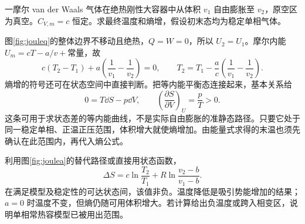 \begin{exercise}
一摩尔 van der Waals 气体在绝热刚性大容器中从体积 $v_1$ 自由膨胀至 $v_2$，原空区为真空。$C_{V,m}=c$ 恒定。求最终温度和熵增，假设初末态均为稳定单相气体。
\end{exercise}
\begin{solution}
图\ref{fig:jouleq}的整体边界不移动且绝热，$Q=W=0$，所以 $U_2=U_1$。摩尔内能 $U_m=cT-a/v+\text{常量}$，故
\[
 c(T_2-T_1)+a\left(\frac1{v_1}-\frac1{v_2}\right)=0,
 \qquad T_2=T_1-\frac ac\left(\frac1{v_1}-\frac1{v_2}\right).
\]
熵增的符号还可在状态空间中直接判断。把等内能平衡态连接起来，基本关系给
\[
 0=T\dd S-p\dd V,
 \qquad \left(\frac{\partial S}{\partial V}\right)_U=\frac pT>0.
\]
这条可用于求状态差的等内能曲线，不是实际自由膨胀的准静态路径。只要它处于同一稳定单相、正温正压范围，体积增大就使熵增加。由能量式求得的末温也须先确认在此范围内，再代入熵公式。

利用图\ref{fig:joulea}的替代路径或直接用状态函数，
\[
 \Delta S=c\ln\frac{T_2}{T_1}+R\ln\frac{v_2-b}{v_1-b}.
\]
在满足模型及稳定性的可达状态间，该值非负。温度降低是吸引势能增加的结果；$a=0$ 时温度不变，但熵仍随可用体积增大。若计算给出负温度或跨入相变区，说明单相常热容模型已被用出范围。
\end{solution}

